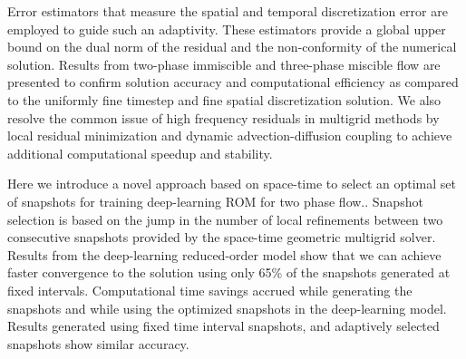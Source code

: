 \begin{addmargin}[2em]{0em}
{Error estimators that measure the spatial and temporal discretization error are employed to guide such an adaptivity. These estimators provide a global upper bound on the dual norm of the residual and the non-conformity of the numerical solution. Results from two-phase immiscible and three-phase miscible flow are presented to confirm solution accuracy and computational efficiency as compared to the uniformly fine timestep and fine spatial discretization solution. We also resolve the common issue of high frequency residuals in multigrid methods by local residual minimization and dynamic advection-diffusion coupling to achieve additional computational speedup and stability.

Here we introduce a novel approach based on space-time to select an optimal set of snapshots for training  deep-learning ROM for two phase flow.. Snapshot selection is based on the jump in the number of local refinements between two consecutive snapshots provided by the space-time  geometric multigrid solver. Results from the deep-learning reduced-order model show that we can achieve faster convergence to the solution using only 65\% of the snapshots generated at fixed intervals. Computational time savings accrued while generating the snapshots and while using the optimized snapshots in the deep-learning model. Results generated using fixed time interval snapshots, and adaptively selected snapshots show similar accuracy.}


\end{addmargin}
